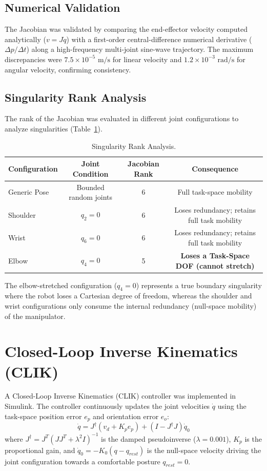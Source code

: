 \documentclass[11pt,a4paper]{article}
\begin{document}
\subsection{Numerical Validation}
The Jacobian was validated by comparing the end-effector velocity computed analytically ($v = J \dot{q}$) with a first-order central-difference numerical derivative ($\Delta p / \Delta t$) along a high-frequency multi-joint sine-wave trajectory. The maximum discrepancies were $7.5 \times 10^{-5}\text{ m/s}$ for linear velocity and $1.2 \times 10^{-3}\text{ rad/s}$ for angular velocity, confirming consistency.

\subsection{Singularity Rank Analysis}
The rank of the Jacobian was evaluated in different joint configurations to analyze singularities (Table~\ref{tab:jacobian_singularities}).

\begin{table}[H]
\centering
\caption{Singularity Rank Analysis.}
\label{tab:jacobian_singularities}
\begin{tabular}{@{}lccc@{}}
\toprule
Configuration & Joint Condition & Jacobian Rank & Consequence \\ \midrule
Generic Pose  & Bounded random joints & 6 & Full task-space mobility \\
Shoulder      & $q_2 = 0$             & 6 & Loses redundancy; retains full task mobility \\
Wrist         & $q_6 = 0$             & 6 & Loses redundancy; retains full task mobility \\
Elbow         & $q_4 = 0$             & 5 & \textbf{Loses a Task-Space DOF (cannot stretch)} \\ \bottomrule
\end{tabular}
\end{table}

The elbow-stretched configuration ($q_4 = 0$) represents a true boundary singularity where the robot loses a Cartesian degree of freedom, whereas the shoulder and wrist configurations only consume the internal redundancy (null-space mobility) of the manipulator.

\section{Closed-Loop Inverse Kinematics (CLIK)}
A Closed-Loop Inverse Kinematics (CLIK) controller was implemented in Simulink. The controller continuously updates the joint velocities $\dot{q}$ using the task-space position error $e_p$ and orientation error $e_o$:
\begin{equation}
\dot{q} = J^{\dagger} (v_d + K_p e_p) + (I - J^{\dagger} J) \dot{q}_0
\end{equation}
where $J^{\dagger} = J^T(J J^T + \lambda^2 I)^{-1}$ is the damped pseudoinverse ($\lambda = 0.001$), $K_p$ is the proportional gain, and $\dot{q}_0 = -K_0 (q - q_{rest})$ is the null-space velocity driving the joint configuration towards a comfortable posture $q_{rest} = 0$.
\end{document}
